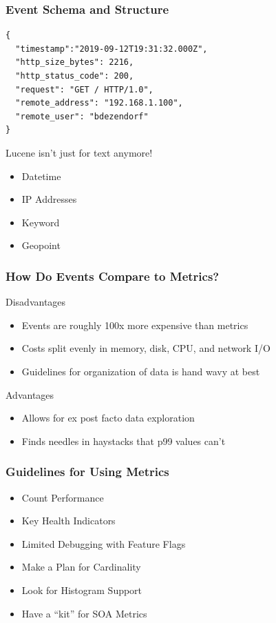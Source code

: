 \begin{frame}[fragile]
    \frametitle{Event Schema and Structure}
    \begin{lstlisting}
{
  "timestamp":"2019-09-12T19:31:32.000Z",
  "http_size_bytes": 2216,
  "http_status_code": 200,
  "request": "GET / HTTP/1.0",
  "remote_address": "192.168.1.100",
  "remote_user": "bdezendorf"
}
    \end{lstlisting}
    Lucene isn't just for text anymore!
    \begin{itemize}
        \item Datetime
        \item IP Addresses
        \item Keyword
        \item Geopoint
    \end{itemize}
\end{frame}

\begin{frame}
    \frametitle{How Do Events Compare to Metrics?}

    Disadvantages

    \begin{itemize}
        \item Events are roughly 100x more expensive than metrics
        \item Costs split evenly in memory, disk, CPU, and network I/O
        \item Guidelines for organization of data is hand wavy at best
    \end{itemize}

    Advantages

    \begin{itemize}
      \item Allows for ex post facto data exploration
      \item Finds needles in haystacks that p99 values can't
    \end{itemize}
\end{frame}

\begin{frame}
    \frametitle{Guidelines for Using Metrics}

    \begin{itemize}
        \item Count Performance
        \item Key Health Indicators
        \item Limited Debugging with Feature Flags
        \item Make a Plan for Cardinality
        \item Look for Histogram Support
        \item Have a ``kit'' for SOA Metrics
    \end{itemize}
\end{frame}

